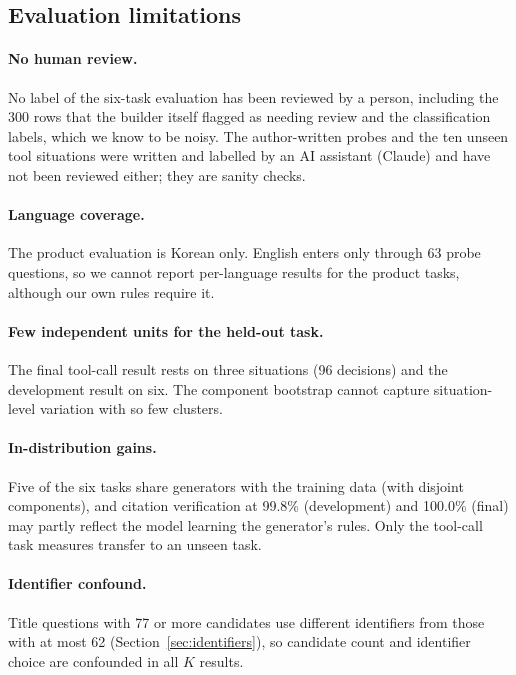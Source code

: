 \subsection{Evaluation limitations}

\paragraph{No human review.}
No label of the six-task evaluation has been reviewed by a person, including the 300 rows
that the builder itself flagged as needing review and the classification labels, which we
know to be noisy. The author-written probes and the ten unseen tool situations were written
and labelled by an AI assistant (Claude) and have not been reviewed either; they are sanity
checks.

\paragraph{Language coverage.}
The product evaluation is Korean only. English enters only through 63 probe questions, so we
cannot report per-language results for the product tasks, although our own rules require it.

\paragraph{Few independent units for the held-out task.}
The final tool-call result rests on three situations (96 decisions) and the development
result on six. The component bootstrap cannot capture situation-level variation with so few
clusters.

\paragraph{In-distribution gains.}
Five of the six tasks share generators with the training data (with disjoint components), and
citation verification at 99.8\% (development) and 100.0\% (final) may partly reflect the model
learning the generator's rules. Only the tool-call task measures transfer to an unseen task.

\paragraph{Identifier confound.}
Title questions with 77 or more candidates use different identifiers from those with at most
62 (Section~\ref{sec:identifiers}), so candidate count and identifier choice are confounded in
all $K$ results.

